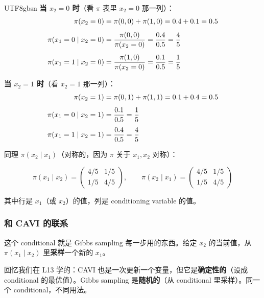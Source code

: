 \documentclass[11pt]{article}
\begin{document}
\begin{CJK}{UTF8}{gbsn}
\textbf{当 $x_2 = 0$ 时}（看 $\pi$ 表里 $x_2 = 0$ 那一列）：
\begin{align}
  \pi(x_2 = 0) &= \pi(0,0) + \pi(1,0) = 0.4 + 0.1 = 0.5 \notag \\[4pt]
  \pi(x_1 = 0 \mid x_2 = 0) &= \frac{\pi(0,0)}{\pi(x_2=0)} = \frac{0.4}{0.5} = \frac{4}{5} \notag \\[4pt]
  \pi(x_1 = 1 \mid x_2 = 0) &= \frac{\pi(1,0)}{\pi(x_2=0)} = \frac{0.1}{0.5} = \frac{1}{5} \notag
\end{align}

\textbf{当 $x_2 = 1$ 时}（看 $x_2 = 1$ 那一列）：
\begin{align}
  \pi(x_2 = 1) &= \pi(0,1) + \pi(1,1) = 0.1 + 0.4 = 0.5 \notag \\[4pt]
  \pi(x_1 = 0 \mid x_2 = 1) &= \frac{0.1}{0.5} = \frac{1}{5} \notag \\[4pt]
  \pi(x_1 = 1 \mid x_2 = 1) &= \frac{0.4}{0.5} = \frac{4}{5} \notag
\end{align}

同理 $\pi(x_2 \mid x_1)$（对称的，因为 $\pi$ 关于 $x_1, x_2$ 对称）：

\[
\pi(x_1 \mid x_2) = \begin{pmatrix} 4/5 & 1/5 \\ 1/5 & 4/5 \end{pmatrix}, \qquad
\pi(x_2 \mid x_1) = \begin{pmatrix} 4/5 & 1/5 \\ 1/5 & 4/5 \end{pmatrix}
\]

其中行是 $x_1$（或 $x_2$）的值，列是 conditioning variable 的值。

\vspace{0.3em}
\noindent{}

\subsubsection{和 CAVI 的联系}

这个 conditional 就是 Gibbs sampling 每一步用的东西。给定 $x_2$ 的当前值，从 $\pi(x_1 \mid x_2)$ 里\textbf{采样}一个新的 $x_1$。

回忆我们在 L13 学的：CAVI 也是一次更新一个变量，但它是\textbf{确定性的}（设成 conditional 的最优值）。Gibbs sampling 是\textbf{随机的}（从 conditional 里采样）。同一个 conditional，不同用法。


\end{CJK}
\end{document}
